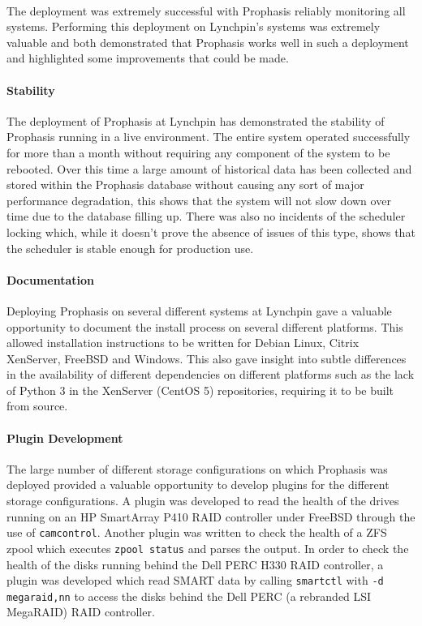 \documentclass[bsc,logo,twoside,singlespacing,notimes]{infthesis}
\begin{document}
\paragraph*{}
	The deployment was extremely successful with Prophasis reliably monitoring all
	systems.  Performing this deployment on Lynchpin's systems was extremely
	valuable and both demonstrated that Prophasis works well in such a deployment
	and highlighted some improvements that could be made.
	
\paragraph*{Stability}
	The deployment of Prophasis at Lynchpin has demonstrated the stability of
	Prophasis running in a live environment.  The entire system operated
	successfully for more than a month without requiring any component of the
	system to be rebooted.  Over this time a large amount of historical data has
	been collected and stored within the Prophasis database without causing any
	sort of major performance degradation, this shows that the system will not slow
	down over time due to the database filling up.  There was also no incidents of
	the scheduler locking which, while it doesn't prove the absence of issues of
	this type, shows that the scheduler is stable enough for production use.
	
\paragraph*{Documentation}
	Deploying Prophasis on several different systems at Lynchpin gave a valuable
	opportunity to document the install process on several different platforms.
	This allowed installation instructions to be written for Debian Linux,
	Citrix XenServer, FreeBSD and Windows.  This also gave insight into subtle
	differences in the availability of different dependencies on different
	platforms such as the lack of Python 3 in the XenServer (CentOS 5)
	repositories, requiring it to be built from source.
	
\paragraph*{Plugin Development}
	The large number of different storage configurations on which Prophasis was
	deployed provided a valuable opportunity to develop plugins for the different
	storage configurations.  A plugin was developed to read the health of the
	drives running on an HP SmartArray P410 RAID controller under FreeBSD through
	the use of \texttt{camcontrol}.  Another plugin was written to check the
	health of a ZFS zpool which executes \texttt{zpool status} and parses the
	output.  In order to check the health of the disks running behind the Dell PERC
	H330 RAID controller, a plugin was developed which read SMART data by calling
	\texttt{smartctl} with \texttt{-d megaraid,nn} to access the disks behind the
	Dell PERC (a rebranded LSI MegaRAID) RAID controller.
	
\end{document}
